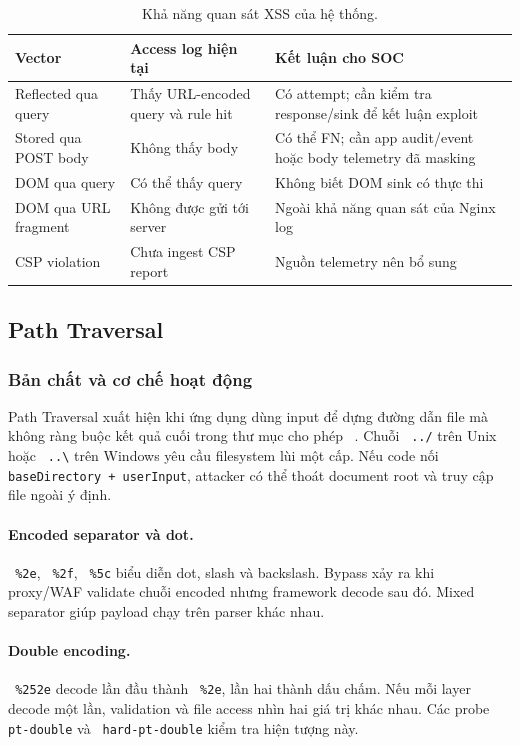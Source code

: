 \documentclass[runningheads]{report-template/llncs}
\newcommand{\code}[1]{\texttt{\small\hyphenchar\font=45 #1}}
\begin{document}
\begin{table}
\caption{Khả năng quan sát XSS của hệ thống.}
\label{tab:xss-visibility}
\centering\small
\begin{tabularx}{\textwidth}{@{}p{31mm}YY@{}}
\toprule
Vector & Access log hiện tại & Kết luận cho SOC\\
\midrule
Reflected qua query & Thấy URL-encoded query và rule hit & Có attempt;
cần kiểm tra response/sink để kết luận exploit\\
Stored qua POST body & Không thấy body & Có thể FN; cần app audit/event
hoặc body telemetry đã masking\\
DOM qua query & Có thể thấy query & Không biết DOM sink có thực thi\\
DOM qua URL fragment & Không được gửi tới server & Ngoài khả năng quan
sát của Nginx log\\
CSP violation & Chưa ingest CSP report & Nguồn telemetry nên bổ sung\\
\bottomrule
\end{tabularx}
\end{table}

\subsection{Path Traversal}

\subsubsection{Bản chất và cơ chế hoạt động}

Path Traversal xuất hiện khi ứng dụng dùng input để dựng đường dẫn file
mà không ràng buộc kết quả cuối trong thư mục cho phép
~\cite{owasppath}. Chuỗi \code{../} trên Unix hoặc \code{..\textbackslash}
trên Windows yêu cầu filesystem lùi một cấp. Nếu code nối
\texttt{baseDirectory + userInput}, attacker có thể thoát document root
và truy cập file ngoài ý định.

\paragraph{Encoded separator và dot.}
\code{\%2e}, \code{\%2f}, \code{\%5c} biểu diễn dot, slash và backslash.
Bypass xảy ra khi proxy/WAF validate chuỗi encoded nhưng framework decode
sau đó. Mixed separator giúp payload chạy trên parser khác nhau.

\paragraph{Double encoding.}
\code{\%252e} decode lần đầu thành \code{\%2e}, lần hai thành dấu chấm.
Nếu mỗi layer decode một lần, validation và file access nhìn hai giá trị
khác nhau. Các probe \code{pt-double} và
\code{hard-pt-double} kiểm tra hiện tượng này.
\end{document}

